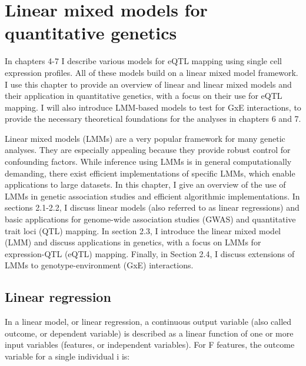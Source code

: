 
\chapter{Linear mixed models for quantitative genetics}

In chapters 4-7 I describe various models for eQTL mapping using single cell expression profiles. All of these models build on a linear mixed model framework. I use this chapter to provide an overview of linear and linear mixed models and their application in quantitative genetics, with a focus on their use for eQTL mapping. I will also introduce LMM-based models to test for GxE interactions, to provide the necessary theoretical foundations for the analyses in chapters 6 and 7.

Linear mixed models (LMMs) are a very popular framework for many genetic analyses. They are especially appealing because they provide robust control for confounding factors. While inference using LMMs is in general computationally demanding, there exist efficient implementations of specific LMMs, which enable applications to large datasets. In this chapter, I give an overview of the use of LMMs in genetic association studies and efficient algorithmic implementations. In sections 2.1-2.2, I discuss linear models (also referred to as linear regressions) and basic applications for genome-wide association studies (GWAS) and quantitative trait loci (QTL) mapping. In section 2.3, I introduce the linear mixed model (LMM) and discuss applications in genetics, with a focus on LMMs for expression-QTL (eQTL) mapping. Finally, in Section 2.4, I discuss extensions of LMMs to genotype-environment (GxE) interactions.

\section{Linear regression}

In a linear model, or linear regression, a continuous output variable (also called outcome, or dependent variable) is described as a linear function of one or more input variables (features, or independent variables). For F features, the outcome variable for a single individual i is:

